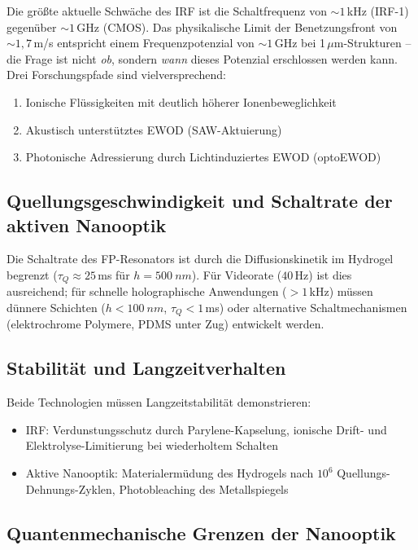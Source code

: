 ﻿\documentclass[a4paper,12pt]{scrreprt}
\theoremstyle{definition}
\begin{document}
Die größte aktuelle Schwäche des IRF ist die Schaltfrequenz von $\sim 1$\,kHz
(IRF-1) gegenüber $\sim 1$\,GHz (CMOS). Das physikalische Limit der
Benetzungsfront von $\sim 1{,}7$\,m/s entspricht einem Frequenzpotenzial
von $\sim 1$\,GHz bei 1\,$\mu$m-Strukturen -- die Frage ist nicht \emph{ob},
sondern \emph{wann} dieses Potenzial erschlossen werden kann. Drei Forschungspfade
sind vielversprechend:
\begin{enumerate}
  \item Ionische Flüssigkeiten mit deutlich höherer Ionenbeweglichkeit
  \item Akustisch unterstütztes EWOD (SAW-Aktuierung)
  \item Photonische Adressierung durch Lichtinduziertes EWOD (optoEWOD)
\end{enumerate}

\subsection{Quellungsgeschwindigkeit und Schaltrate der aktiven Nanooptik}

Die Schaltrate des FP-Resonators ist durch die Diffusionskinetik im Hydrogel
begrenzt ($\tau_Q \approx 25$\,ms für $h = \SI{500}{nm}$). Für Videorate
($40$\,Hz) ist dies ausreichend; für schnelle holographische Anwendungen
($> 1$\,kHz) müssen dünnere Schichten ($h < \SI{100}{nm}$, $\tau_Q < 1$\,ms)
oder alternative Schaltmechanismen (elektrochrome Polymere, PDMS unter Zug)
entwickelt werden.

\subsection{Stabilität und Langzeitverhalten}

Beide Technologien müssen Langzeitstabilität demonstrieren:
\begin{itemize}
  \item IRF: Verdunstungsschutz durch Parylene-Kapselung, ionische Drift-
    und Elektrolyse-Limitierung bei wiederholtem Schalten
  \item Aktive Nanooptik: Materialermüdung des Hydrogels nach $10^6$
    Quellungs-Dehnungs-Zyklen, Photobleaching des Metallspiegels
\end{itemize}

\subsection{Quantenmechanische Grenzen der Nanooptik}
\end{document}
